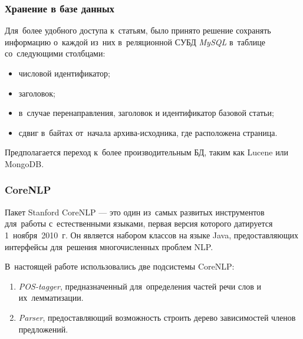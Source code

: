 \documentclass{beamer}
\begin{document}
\begin{frame}
\frametitle{Хранение в базе данных}

Для~более удобного доступа к~статьям,
было принято решение сохранять информацию о~каждой из~них 
в~реляционной СУБД \textit{MySQL} в~таблице со~следующими столбцами:

\begin{itemize}
\item{числовой идентификатор;}
\item {заголовок;}
\item {в~случае перенаправления, заголовок и идентификатор базовой статьи;}
\item {
сдвиг в~байтах от~начала архива-исходника, 
где расположена страница.
}
\end{itemize}

Предполагается переход к~более производительным БД, 
таким как Lucene или MongoDB. 

\end{frame}

\begin{frame}
\frametitle{CoreNLP}
Пакет Stanford CoreNLP --- это один из~самых развитых инструментов для~работы с~естественными языками, 
первая версия которого датируется 1~ноября~2010~г.
Он является набором классов на языке Java, предоставляющих интерфейсы для~решения многочисленных проблем NLP. 

В~настоящей работе использовались две подсистемы CoreNLP:

\begin{enumerate}

\item {{\it POS-tagger}, предназначенный для~определения частей речи слов и их~лемматизации.}
\item {{\it Parser}, предоставляющий возможность строить дерево зависимостей членов предложений.}

\end{enumerate}

\end{frame}
\end{document}
